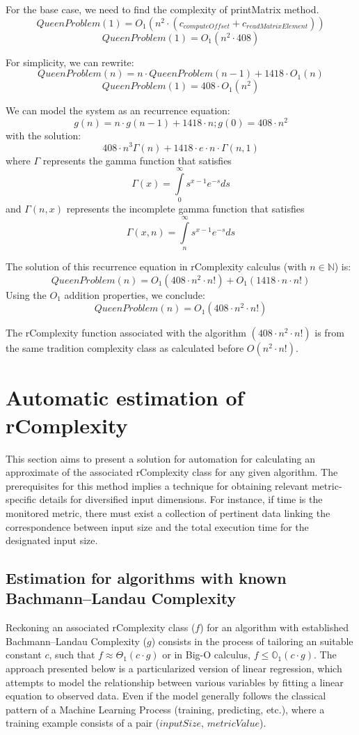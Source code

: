 For the base case, we need to find the complexity of printMatrix method.
\[ QueenProblem(1)=O_{1}(n^{2} \cdot  (c_{computeOffset} + c_{readMatrixElement}))\]
\[ QueenProblem(1)=O_{1}(n^{2} \cdot  408) \]

For simplicity, we can rewrite:
\[QueenProblem(n) = n \cdot QueenProblem(n-1) +  1418 \cdot O_{1}(n) \]
\[ QueenProblem(1)= 408 \cdot O_{1}(n^{2}) \]

We can model the system as an recurrence equation:
\[ g(n) = n \cdot  g(n-1) + 1418 \cdot  n; g(0) = 408 \cdot  n^{2} \]
with the solution:
\[ 408 \cdot n^{3} \Gamma(n) + 1418 \cdot e \cdot  n \cdot \Gamma(n, 1)\]
where $\Gamma$ represents the gamma function that satisfies \[ \Gamma \left( x \right) = \int\limits_0^\infty {s^{x - 1} e^{ - s} ds} \] and $ \Gamma(n,x)$ represents the incomplete gamma function that satisfies \[ \Gamma \left(x, n \right) = \int\limits_n^\infty {s^{x - 1} e^{ - s} ds}\]

The solution of this recurrence equation in rComplexity calculus (with $n \in \mathbb{N}$) is:
\[ QueenProblem(n) = O_{1}(408 \cdot n^{2} \cdot n!) +  O_{1}(1418 \cdot n \cdot n!) \]
Using the $O_{1}$ addition properties, we conclude:
\[ QueenProblem(n) = O_{1}(408 \cdot n^{2} \cdot n!) \]

\begin{remark}
The rComplexity function associated with the algorithm $(408 \cdot n^{2} \cdot n!)$ is from the same tradition complexity class as calculated before $ O(n^2\cdot n!)$.
\end{remark}


\section{Automatic estimation of rComplexity}
This section aims to present a solution for automation for calculating an approximate of the associated rComplexity class for any given algorithm. The prerequisites for this method implies a technique for obtaining relevant metric-specific details for diversified input dimensions. For instance, if time is the monitored metric, there must exist a collection of pertinent data linking the correspondence between input size and the total execution time for the designated input size.

\subsection{Estimation for algorithms with known Bachmann–Landau Complexity}
Reckoning an associated rComplexity class ($f$) for an algorithm with established Bachmann–Landau Complexity ($g$) consists in the process of tailoring an suitable constant $c$, such that $f \approx \Theta_{1}(c \cdot g)$ or in Big-O calculus, $f \leq  \mathbb{O}_{1} (c \cdot g)$. The approach presented below is a particularized version of linear regression, which attempts to model the relationship between various variables by fitting a linear equation to observed data. Even if the model generally follows the classical pattern of a Machine Learning Process (training, predicting, etc.), where a training example consists of a pair ($inputSize$, $metricValue$).

